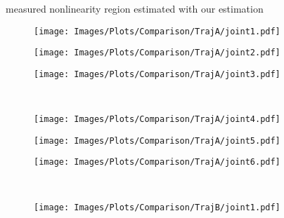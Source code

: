 \begin{figure*}
    \centering
    \newcommand*{\figsize}{0.32\textwidth}

    \begin{center}
    \footnotesize{{\legblue} measured \hspace{0.5em} {\boxgray} nonlinearity region \hspace{0.5em} {\legred} estimated with \cite{gaz_model-based_2018} \hspace{0.5em} {\legyellow} our estimation}
    \end{center}

    \begin{subfigure}[b]{\figsize}
        \centering
        \texttt{[image: Images/Plots/Comparison/TrajA/joint1.pdf]}
    \end{subfigure}
    \hfill
    \begin{subfigure}[b]{\figsize}
        \centering
        \texttt{[image: Images/Plots/Comparison/TrajA/joint2.pdf]}
    \end{subfigure}
    \hfill
    \begin{subfigure}[b]{\figsize}
        \centering
        \texttt{[image: Images/Plots/Comparison/TrajA/joint3.pdf]}
    \end{subfigure}
    \\ \vspace{0.25em}
    \begin{subfigure}[b]{\figsize}
        \centering
        \texttt{[image: Images/Plots/Comparison/TrajA/joint4.pdf]}
    \end{subfigure}
    \hfill
    \begin{subfigure}[b]{\figsize}
        \centering
        \texttt{[image: Images/Plots/Comparison/TrajA/joint5.pdf]}
    \end{subfigure}
    \hfill
    \begin{subfigure}[b]{\figsize}
        \centering
        \texttt{[image: Images/Plots/Comparison/TrajA/joint6.pdf]}
    \end{subfigure}
    \\ \vspace{0.25em}  %
    \begin{subfigure}[b]{\figsize}
        \centering
        \texttt{[image: Images/Plots/Comparison/TrajB/joint1.pdf]}
    \end{subfigure}

\end{figure*}
